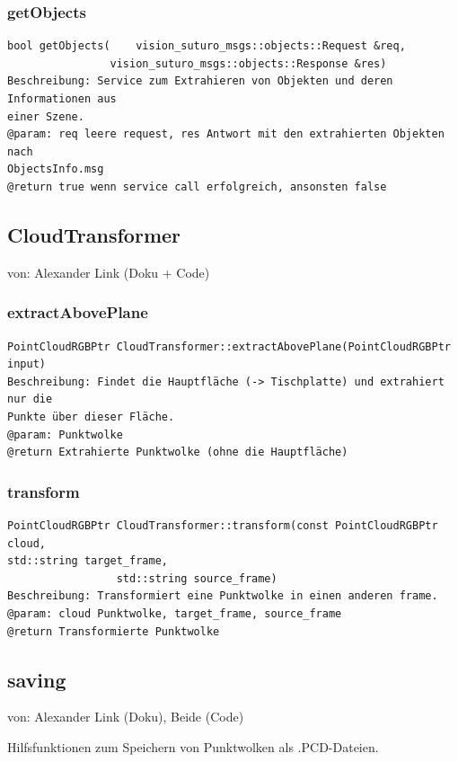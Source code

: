 \documentclass{suturo}
\makeatletter
\newcommand{\chapterauthor}[1]{%
  {\parindent0pt\vspace*{-27pt}%
  \linespread{0}\small\begin{flushright}von: #1\end{flushright}%
  \par\nobreak\vspace*{0pt}}
  \@afterheading%
}
\makeatother
\begin{document}
\subsubsection{getObjects}
\begin{verbatim}
bool getObjects(	vision_suturo_msgs::objects::Request &req, 
			    vision_suturo_msgs::objects::Response &res)
Beschreibung: Service zum Extrahieren von Objekten und deren Informationen aus
einer Szene.
@param: req leere request, res Antwort mit den extrahierten Objekten nach
ObjectsInfo.msg
@return true wenn service call erfolgreich, ansonsten false
\end{verbatim}\label{func:getobjects}


\subsection*{CloudTransformer}
\chapterauthor{Alexander Link (Doku + Code)}

\subsubsection{extractAbovePlane}
\begin{verbatim}
PointCloudRGBPtr CloudTransformer::extractAbovePlane(PointCloudRGBPtr input)
Beschreibung: Findet die Hauptfläche (-> Tischplatte) und extrahiert nur die
Punkte über dieser Fläche.
@param: Punktwolke
@return Extrahierte Punktwolke (ohne die Hauptfläche)
\end{verbatim}\label{func:extractaboveplane}
\subsubsection{transform}
\begin{verbatim}
PointCloudRGBPtr CloudTransformer::transform(const PointCloudRGBPtr cloud,
std::string target_frame,
                 std::string source_frame)
Beschreibung: Transformiert eine Punktwolke in einen anderen frame.
@param: cloud Punktwolke, target_frame, source_frame
@return Transformierte Punktwolke
\end{verbatim}\label{func:transform}

\subsection*{saving}
\chapterauthor{Alexander Link (Doku), Beide (Code)}
Hilfsfunktionen zum Speichern von Punktwolken als .PCD-Dateien.
\end{document}
